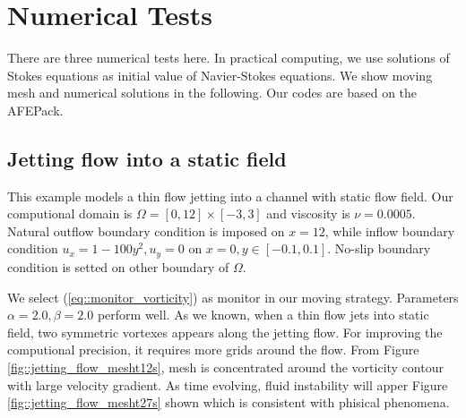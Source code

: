 \documentclass[a4paper, 11pt]{article}
\begin{document}
\section{Numerical Tests}
     There are three numerical tests here. In practical computing, 
     we use solutions of Stokes equations as initial value of
     Navier-Stokes equations.  We show moving mesh and numerical
     solutions in the following. Our codes are based on the AFEPack.

     \subsection{Jetting flow into a static field}
       This example models a thin flow jetting into a channel with
       static flow field.  
       Our computional domain is $\Omega = [0, 12] \times [-3, 3]$ and
       viscosity is $\nu = 0.0005$.
       Natural outflow boundary condition is imposed on $x = 12$,
       while inflow boundary condition $u_x = 1 - 100 y^2, u_y = 0$ on
       $x = 0, y \in [-0.1, 0.1]$. No-slip boundary condition is
       setted on other boundary of $\Omega$. 
       
       We select (\ref{eq::monitor_vorticity}) as monitor in our
       moving strategy. Parameters $\alpha = 2.0, \beta = 2.0$ perform
       well. As we known, when a thin flow jets into static
       field, two symmetric vortexes appears along the jetting flow.
       For improving the computional precision, it requires more grids
       around the flow. From Figure \ref{fig::jetting_flow_mesht12s}, mesh 
       is concentrated around the vorticity contour with large
       velocity gradient. As time evolving, fluid instability will apper
       Figure \ref{fig::jetting_flow_mesht27s} shown which is
       consistent with phisical phenomena.
\end{document}
